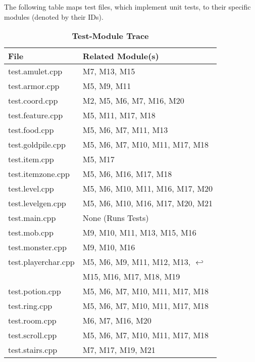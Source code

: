 \documentclass[12pt, titlepage]{article}
\begin{document}

	\newpage
	The following table maps test files, which implement unit tests, to their specific modules (denoted by their IDs).

	\begin{table}[H]\label{TblTMT}
		\caption{\bf Test-Module Trace}
		\centering
		\bigskip
		\def\arraystretch{1.04}
		\begin{tabular}{p{} R{0.90\textwidth}}
			\toprule
			\bf File & \bf Related Module(s)\\
			\midrule
            test.amulet.cpp         & M7, M13, M15\\
            test.armor.cpp          & M5, M9, M11\\
            test.coord.cpp          & M2, M5, M6, M7, M16, M20\\
            test.feature.cpp        & M5, M11, M17, M18\\
            test.food.cpp           & M5, M6, M7, M11, M13\\
            test.goldpile.cpp       & M5, M6, M7, M10, M11, M17, M18\\
            test.item.cpp           & M5, M17\\
            test.itemzone.cpp       & M5, M6, M16, M17, M18\\
            test.level.cpp          & M5, M6, M10, M11, M16, M17, M20\\
            test.levelgen.cpp       & M5, M6, M10, M16, M17, M20, M21\\
            test.main.cpp           & None (Runs Tests)\\
            test.mob.cpp            & M9, M10, M11, M13, M15, M16\\
            test.monster.cpp        & M9, M10, M16\\
            test.playerchar.cpp     & M5, M6, M9, M11, M12, M13, $\hookleftarrow$\\
                                    & M15, M16, M17, M18, M19\\
            test.potion.cpp         & M5, M6, M7, M10, M11, M17, M18\\
            test.ring.cpp           & M5, M6, M7, M10, M11, M17, M18\\
            test.room.cpp           & M6, M7, M16, M20\\
            test.scroll.cpp         & M5, M6, M7, M10, M11, M17, M18\\
            test.stairs.cpp         & M7, M17, M19, M21\\

\end{tabular}
\end{table}
\end{document}
